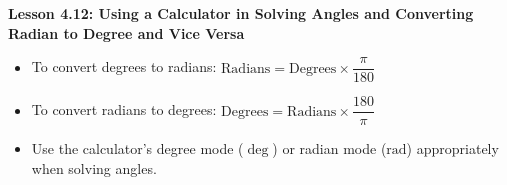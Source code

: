\begin{center}
\textbf{Lesson 4.12: Using a Calculator in Solving Angles and Converting Radian to Degree and Vice Versa}
\end{center}

\vspace*{-1.5ex}

\begin{itemize}
    \item To convert degrees to radians: \(\text{Radians} = \text{Degrees} \times \dfrac{\pi}{180}\)
    \item To convert radians to degrees: \(\text{Degrees} = \text{Radians} \times \dfrac{180}{\pi}\)
    \item Use the calculator's degree mode (\(\deg\)) or radian mode (\(\text{rad}\)) appropriately when solving angles.
\end{itemize}
